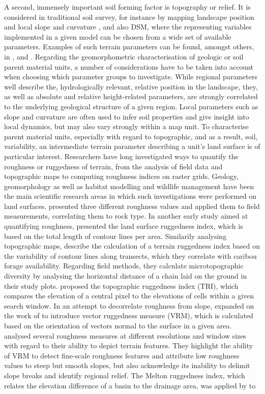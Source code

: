 \documentclass[preprint,12pt,authoryear]{elsarticle}
\begin{document}
A second, immensely important soil forming factor is topography or relief. It is considered in traditional soil survey, for instance by mapping landscape position and local slope and curvature \citep{FAO2006}, and also DSM, where the representing variables implemented in a given model can be chosen from a wide set of available parameters. Examples of such terrain parameters can be found, amongst others, in \cite{Boehner2009},\cite{Gallant2000} and \cite{Olaya2009141} . Regarding the geomorphometric characterisation of geologic or soil parent material units, a number of considerations have to be taken into account when choosing which parameter groups to investigate. While regional parameters well describe the, hydrologically relevant, relative position in the landscape, they, as well as absolute and relative height-related parameters, are strongly correlated to the underlying geological structure of a given region. Local parameters such as slope and curvature are often used to infer soil properties and give insight into local dynamics, but may also vary strongly within a map unit. To characterise parent material units, especially with regard to topographic, and as a result, soil, variability, an intermediate terrain parameter describing a unit's land surface is of particular interest. Researchers have long investigated ways to quantify the roughness or ruggedness of terrain, from the analysis of field data and topographic maps to computing roughness indices on raster grids. Geology, geomorphology as well as habitat modelling and wildlife management have been the main scientific research areas in which such investigations were performed on land surfaces.  \cite{Hobson1972} presented three different roughness values and applied them to field measurements, correlating them to rock type. In another early study aimed at quantifying roughness, \cite{Beasom1983} presented the land surface ruggedness index, which is based on the total length of contour lines per area. Similarily analysing topographic maps, \cite{Nellemann1994} describe the calculation of a terrain ruggedness index based on the variability of contour lines along transects, which they correlate with caribou forage availability. Regarding field methods, they calculate microtopographic diversity by analysing the horizontal distance of a chain laid on the ground in their study plots. \cite{Riley1999} proposed the topographic ruggedness index (TRI), which compares the elevation of a central pixel to the elevations of cells within a given search window. In an attempt to decorrelate roughness from slope, \cite{Sappington2007} expanded on the work of \cite{Hobson1972} to introduce vector ruggedness measure (VRM), which is calculated based on the orientation of vectors normal to the surface in a given area. \citep{Grohmann2010} analysed several roughness measures at different resolutions and window sizes with regard to their ability to depict terrain features. They highlight the ability of VRM to detect fine-scale roughness features and attribute low roughness values to steep but smooth slopes, but also acknowledge its inability to delimit slope breaks and identify regional relief. The Melton ruggedness index, which relates  the elevation difference of a basin to the drainage area, was applied by \cite{Marchi2005} to 
\end{document}
